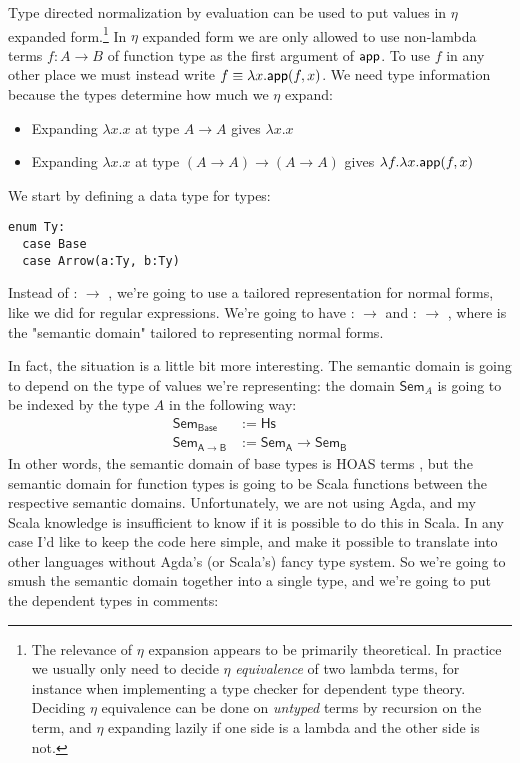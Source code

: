 Type directed normalization by evaluation can be used to put values in $\eta$ expanded form.\footnote{
  The relevance of $\eta$ expansion appears to be primarily theoretical.
  In practice we usually only need to decide $\eta$ \emph{equivalence} of two lambda terms, for instance when implementing a type checker for dependent type theory.
  Deciding $\eta$ equivalence can be done on \emph{untyped} terms by recursion on the term, and $\eta$ expanding lazily if one side is a lambda and the other side is not.
}
In $\eta$ expanded form we are only allowed to use non-lambda terms $f : A \to B$ of function type as the first argument of $\mathsf{app}$.
To use $f$ in any other place we must instead write $f \equiv \lambda x. \mathsf{app}(f,x)$.
We need type information because the types determine how much we $\eta$ expand:
\begin{itemize}
  \item Expanding $\lambda x. x$ at type $A \to A$ gives $\lambda x. x$
  \item Expanding $\lambda x. x$ at type $(A \to A) \to (A \to A)$ gives $\lambda f. \lambda x. \mathsf{app}(f,x)$
\end{itemize}

We start by defining a data type for types:

\begin{lstlisting}
enum Ty:
  case Base
  case Arrow(a:Ty, b:Ty)
\end{lstlisting}

Instead of  :  $\to$ , we're going to use a tailored representation for normal forms, like we did for regular expressions.
We're going to have  :  $\to$  and  :  $\to$ , where  is the "semantic domain" tailored to representing normal forms.

In fact, the situation is a little bit more interesting.
The semantic domain is going to depend on the type of values we're representing: the domain $\mathsf{Sem}_A$ is going to be indexed by the type $A$ in the following way:
\begin{align*}
  \mathsf{Sem}_\mathsf{Base} &:= \mathsf{Hs} \\
  \mathsf{Sem}_{\mathsf{A} \to \mathsf{B}} &:= \mathsf{Sem}_\mathsf{A} \to \mathsf{Sem}_\mathsf{B}
\end{align*}
In other words, the semantic domain of base types is HOAS terms , but the semantic domain for function types is going to be Scala functions between the respective semantic domains.
Unfortunately, we are not using Agda, and my Scala knowledge is insufficient to know if it is possible to do this in Scala.
In any case I'd like to keep the code here simple, and make it possible to translate into other languages without Agda's (or Scala's) fancy type system.
So we're going to smush the semantic domain together into a single type, and we're going to put the dependent types in comments:

